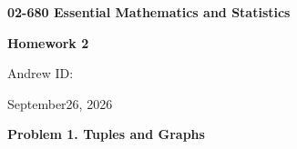 \documentclass[12pt]{article}
\begin{document}
\begin{center}

    {\Large \textbf{02-680 Essential Mathematics and Statistics}}
    
    \vspace{0.4em}
    
    {\large \textbf{Homework 2}}
    
    \vspace{0.7em}
    
   
    
    \vspace{0.2em}
    
    Andrew ID: 
    
    \vspace{0.2em}
    
    September26, 2026

\end{center}

\vspace{1em}


\vspace{1em}

\vspace{1em}

\textbf{Problem 1. Tuples and Graphs}
\end{document}
